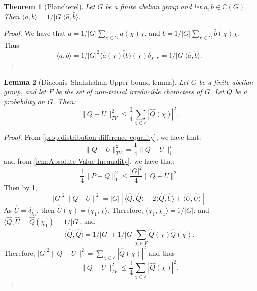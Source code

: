 \documentclass[]{article}
\newtheorem{theorem}{Theorem}
\newtheorem{lemma}[theorem]{Lemma}
\theoremstyle{definition}
\numberwithin{theorem}{section}
\numberwithin{equation}{section}
\begin{document}
\begin{theorem}[Plancherel]
	\label{thm:Plancherel}
	Let $G$ be a finite abelian group and let $a, b \in \mathbb{C}(G)$. Then $\langle a, b \rangle = 1/|G| \langle \widehat{a}, \widehat{b} \rangle$. 
\end{theorem}
\begin{proof}
	We have that $a = 1/|G| \sum_{\chi \in \widehat{G}} \widehat{a}(\chi) \chi$, and $b = 1/|G| \sum_{\chi \in \widehat{G}} \widehat{b}(\chi) \chi$. Thus \begin{equation}
		\langle a, b \rangle = 1/|G|^2 \langle \widehat{a}(\chi) \widehat(b)(\chi) \delta_{\chi, \chi} = 1/|G| \langle \widehat{a}, \widehat{b} \rangle.
	\end{equation}

\end{proof}

\begin{lemma}[Diaconis–Shahshahan Upper bound lemma]
	\label{lem:Upper bound lemma}
	Let $G$ be a finite abelian group, and let $F$ be the set of non-trivial irreducible characters of $G$. Let $Q$ be a probability on $G$.  Then:
	\begin{equation}
		\|Q - U\|^2_{TV} \leq \frac{1}{4} \sum_{\chi \in F} |\widehat{Q}(\chi)|^2.
	\end{equation}
\end{lemma}
\begin{proof}[Proof]
	From \cref{prop:distribution difference equality}, we have that:
	\begin{equation}
		\|Q - U\|^2_{TV} = \frac{1}{4} \| Q - U\|_1^2
	\end{equation}
	and from \cref{lem:Absolute Value Inequality}, we have that:
	\begin{equation}
		\frac{1}{4} \| P - Q\|_1^2 \leq \frac{|G|^2}{4} \| Q - U \|^2
	\end{equation}
	Then by \cref{thm:Plancherel},
	\begin{equation}
		|G|^2 \|Q - U \|^2 = |G| \left[ \langle \widehat{Q}, \widehat{Q} \rangle - 2 \langle \widehat{Q}, \widehat{U} \rangle + \langle \widehat{U}, \widehat{U} \rangle \right]
	\end{equation}
	As $\widehat{U} = \delta_{\chi_1}$, then $\widehat{U}(\chi) = \langle \chi_1, \chi \rangle$. 
	Therefore, $\langle \chi_1, \chi_1 \rangle = 1/|G|$, and $\langle \widehat{Q}, \widehat{U} = \widehat{Q}(\chi_1) = 1/|G|$, and
	\begin{equation}
		\langle \widehat{Q}, \widehat{Q} \rangle = 1/|G| + 1/|G| \sum_{\chi \in F} \widehat{Q}(\chi) \overline{\widehat{Q}(\chi)}.
	\end{equation}
	Therefore, $|G|^2 \|Q - U \|^2 =  \sum_{\chi \in F}| \widehat{Q}(\chi)|^2$ and thus 
	\begin{equation}
		\|Q - U\|^2_{TV} \leq \frac{1}{4} \sum_{\chi \in F} |\widehat{Q}(\chi)|^2.
	\end{equation}
\end{proof}
\end{document}
